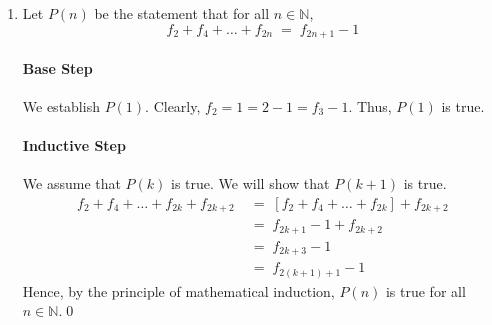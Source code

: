 \documentclass[10pt]{article}
\begin{document}
\begin{enumerate}
\begin{enumerate}
                        \paragraph{Inductive Step}
                        We assume that $P(k)$ is true. We will show that $P(k + 1)$ is true.
                        \begin{align*}
                                f_1 + f_3 + \dots + f_{2k - 1} + f_{2k + 1} 
                                        \;&=\; [f_1 + f_3 + \dots + f_{2k - 1}] + f_{2k + 1} \\
                                        \;&=\; f_{2k} + f_{2k + 1} \\
                                        \;&=\; f_{2k + 2} \\
                                        \;&=\; f_{2(k + 1)}
                        \end{align*}
                        Hence, by the principle of mathematical induction, $P(n)$ is true for all $n \in \mathbb{N}$.\qed\\

                        \item Let $P(n)$ be the statement that for all $n \in \mathbb{N}$,
                        \[
                        f_2 + f_4 + \dots + f_{2n} \;=\; f_{2n + 1} - 1
                        \]
                        \paragraph{Base Step}
                        We establish $P(1)$. Clearly, $f_2 = 1 = 2 - 1 = f_3 - 1$. Thus, $P(1)$ is true.
                        \paragraph{Inductive Step}
                        We assume that $P(k)$ is true. We will show that $P(k + 1)$ is true.
                        \begin{align*}
                                f_2 + f_4 + \dots + f_{2k} + f_{2k + 2} 
                                        \;&=\; [f_2 + f_4 + \dots + f_{2k}] + f_{2k + 2} \\
                                        \;&=\; f_{2k + 1} - 1 + f_{2k + 2} \\
                                        \;&=\; f_{2k + 3} - 1 \\
                                        \;&=\; f_{2(k + 1) + 1} - 1
                        \end{align*}
                        Hence, by the principle of mathematical induction, $P(n)$ is true for all $n \in \mathbb{N}$.\qed\\
                \end{enumerate}
        \end{enumerate}
\end{document}
